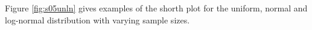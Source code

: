 \documentclass[dvips,12pt,a4paper,twoside]{amsart}
\begin{document}
Figure \ref{fig:s05unln} gives examples of the shorth plot for the uniform, normal and log-normal distribution with varying sample sizes.
%
%
%
\end{document}
